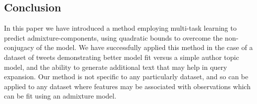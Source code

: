 \subsection{Conclusion}
In this paper we have introduced a method employing multi-task learning to predict admixture-components, using quadratic bounds to overcome the non-conjugacy of the model. We have successfully applied this method in the case of a dataset of tweets demonstrating better model fit versus a simple author topic model, and the ability to generate additional text that may help in query expansion. Our method is not specific to any particularly dataset, and so can be applied to any dataset where features may be associated with observations which can be fit using an admixture model.


%



